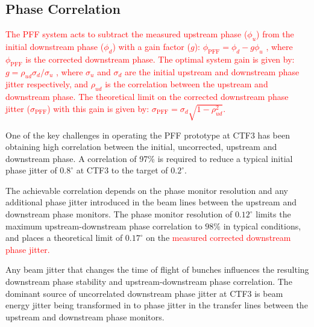 \documentclass[%
 reprint,
superscriptaddress,
 amsmath,amssymb,
 prl,
]{revtex4-1}
\begin{document}

\subsection{\label{ss:r56} Phase Correlation}

\textcolor{red}{The PFF system acts to subtract the measured upstream phase 
(\(\phi_u\)) from 
the initial downstream phase (\(\phi_d\)) with a gain factor (\(g\)):
\(\phi_{\mathrm{PFF}} = \phi_d - g\phi_u\)
, where \(\phi_{\mathrm{PFF}}\) is the corrected downstream phase. The optimal 
system gain is given by:
\(g = \rho_{ud} \sigma_d/\sigma_u\)
, where \(\sigma_u\) and \(\sigma_d\) are the initial upstream and downstream 
phase jitter respectively, and \(\rho_{ud}\) is the correlation between the 
upstream and downstream phase. The theoretical limit on the corrected 
downstream phase jitter (\(\sigma_{\mathrm{PFF}}\)) with this gain is given by:
\(\sigma_{\mathrm{PFF}}=\sigma_d \sqrt{1-\rho_{ud}^2}\).}

One of the key challenges in operating the PFF prototype at CTF3 has been 
obtaining high correlation between the initial, uncorrected, upstream and 
downstream phase. A correlation of 97\% is required to reduce a typical initial 
phase jitter of \(0.8^\circ\) at CTF3 to the target of \(0.2^\circ\). 

The achievable correlation depends on the phase monitor resolution and any 
additional phase jitter introduced in the beam lines between the upstream and 
downstream phase monitors. The phase monitor resolution of \(0.12^\circ\) 
limits the maximum upstream-downstream phase correlation to
\(98\%\) in typical conditions, and places a theoretical limit of
\(0.17^\circ\) on the \textcolor{red}{measured corrected downstream phase 
jitter.}

Any beam jitter that changes the time of flight of bunches influences the 
resulting downstream phase stability and upstream-downstream phase correlation. 
The dominant source of uncorrelated downstream phase jitter at CTF3 is beam 
energy jitter being transformed in to phase jitter in the transfer lines 
between the upstream and downstream phase monitors.
\end{document}
